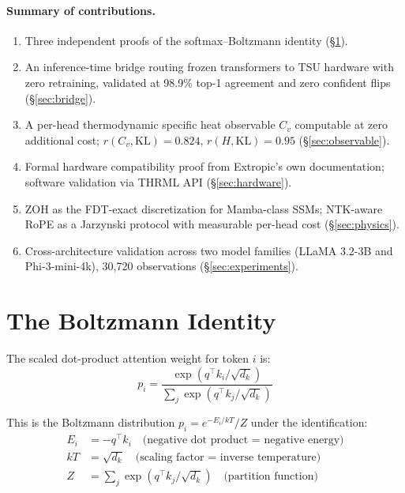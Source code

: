 \documentclass[11pt,a4paper]{article}
\begin{document}
\paragraph{Summary of contributions.}
\begin{enumerate}[nosep]
  \item Three independent proofs of the softmax--Boltzmann identity (\S\ref{sec:identity}).
  \item An inference-time bridge routing frozen transformers to TSU hardware
        with zero retraining, validated at 98.9\% top-1 agreement and zero
        confident flips (\S\ref{sec:bridge}).
  \item A per-head thermodynamic specific heat observable $C_v$ computable
        at zero additional cost; $r(C_v,\mathrm{KL})=0.824$,
        $r(H,\mathrm{KL})=0.95$ (\S\ref{sec:observable}).
  \item Formal hardware compatibility proof from Extropic's own documentation;
        software validation via THRML API (\S\ref{sec:hardware}).
  \item ZOH as the FDT-exact discretization for Mamba-class SSMs;
        NTK-aware RoPE as a Jarzynski protocol with measurable per-head cost (\S\ref{sec:physics}).
  \item Cross-architecture validation across two model families (LLaMA 3.2-3B
        and Phi-3-mini-4k), 30,720 observations (\S\ref{sec:experiments}).
\end{enumerate}

\section{The Boltzmann Identity}
\label{sec:identity}

The scaled dot-product attention weight for token $i$ is:
\begin{equation}
  p_i = \frac{\exp(q^\top k_i / \sqrt{d_k})}{\sum_j \exp(q^\top k_j / \sqrt{d_k})}
  \label{eq:softmax}
\end{equation}

This is the Boltzmann distribution $p_i = e^{-E_i/kT}/Z$ under the identification:
\begin{align}
  E_i &= -q^\top k_i \quad \text{(negative dot product = negative energy)} \\
  kT &= \sqrt{d_k} \quad \text{(scaling factor = inverse temperature)} \\
  Z &= \textstyle\sum_j \exp(q^\top k_j / \sqrt{d_k}) \quad \text{(partition function)}
\end{align}
\end{document}
